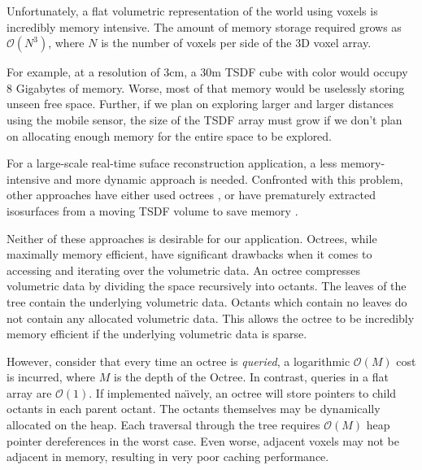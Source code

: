 \documentclass[10pt,twocolumn,letterpaper]{article}
\begin{document}
Unfortunately, a flat volumetric representation of the world using voxels is
incredibly memory intensive. The amount of memory storage required grows as
$\mathcal{O}(N^3)$, where $N$ is the number of voxels per side of the 3D voxel
array.

For example, at a resolution of $3\text{cm}$,  a $30\text{m}$ TSDF cube with
color would occupy 8 Gigabytes of memory. Worse, most of that memory would be
uselessly storing unseen free space. Further, if we plan on exploring larger and larger
distances using the mobile sensor, the size of the TSDF array must grow if we
don't plan on allocating enough memory for the entire space to be explored.

For a large-scale real-time suface reconstruction application, a less
memory-intensive and more dynamic approach is needed. Confronted with this
problem, other approaches have either used  octrees \cite{Wurm2010}, or have
prematurely extracted isosurfaces from a moving TSDF volume to save memory
\cite{Whelan2013}.

Neither of these approaches is desirable for our application. Octrees, while
maximally memory efficient, have significant drawbacks when it comes to
accessing and iterating over the volumetric data. An octree compresses
volumetric data by dividing the space recursively into octants. The leaves of
the tree contain the underlying volumetric data. Octants which contain no
leaves do not contain any allocated volumetric data. This allows the octree to
be incredibly memory efficient if the underlying volumetric data is sparse.

However, consider that every time an octree is \emph{queried},  a
logarithmic $\mathcal{O}(M)$ cost is incurred, where $M$ is the depth of the
Octree. In contrast, queries in a flat array are $\mathcal{O}(1)$.  If implemented na\"{\i}vely, an
octree will store pointers to child octants in each parent octant. The octants
themselves may be dynamically allocated on the heap. Each traversal through the
tree requires $\mathcal{O}(M)$ heap pointer dereferences in the worst case.
Even worse, adjacent voxels may not be adjacent in memory, resulting in very
poor caching performance.
\end{document}

